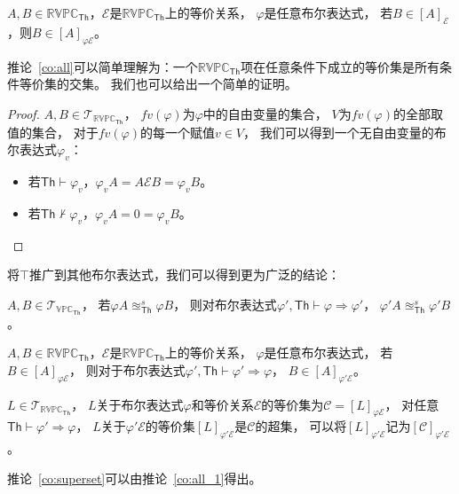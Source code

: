    \begin{corollary}\label{co:all}
      $A,B\in \mathbb{RVPC}_{\mathsf{Th}}$，$\mathcal{E}$是$\mathbb{RVPC}_{\mathsf{Th}}$上的等价关系，
      $\varphi$是任意布尔表达式，
      若$B\in [A]_{\mathcal{E}}$，则$B\in [A]_{\varphi \mathcal{E}}$。
   \end{corollary}
   
   推论~\ref{co:all}可以简单理解为：一个$\mathbb{RVPC}_{\mathsf{Th}}$项在任意条件下成立的等价集是所有条件等价集的交集。
   我们也可以给出一个简单的证明。
   \begin{proof}
      $A,B\in \mathcal{T}_{\mathbb{RVPC}_{\mathsf{Th}}}$，
      $fv(\varphi)$为$\varphi$中的自由变量的集合，
      $V$为$fv(\varphi)$的全部取值的集合，
      对于$fv(\varphi)$的每一个赋值$v\in V$，
      我们可以得到一个无自由变量的布尔表达式$\varphi_v$：
      \begin{itemize}
         \item {
            若$\mathsf{Th}\vdash \varphi_v$，$\varphi_vA=A\mathcal{E}B=\varphi_v B$。
         }
         \item {
            若$\mathsf{Th}\not\vdash \varphi_v$，$\varphi_v A=0=\varphi_v B$。
         }
      \end{itemize}
   \end{proof}

   将$\top$推广到其他布尔表达式，我们可以得到更为广泛的结论：

   \begin{corollary}\label{co:condition}
      $A,B\in \mathcal{T}_{\mathbb{VPC}_{\mathsf{Th}}}$，
      若$\varphi A\approxeq_{\mathsf{Th}}^s \varphi B$，
      则对布尔表达式$\varphi',\mathsf{Th}\vdash \varphi\Rightarrow \varphi'$，
      $\varphi' A\approxeq_{\mathsf{Th}}^s\varphi' B$。
   \end{corollary}

   \begin{corollary}\label{co:all_1}
      $A,B\in \mathbb{RVPC}_{\mathsf{Th}}$，$\mathcal{E}$是$\mathbb{RVPC}_{\mathsf{Th}}$上的等价关系，
      $\varphi$是任意布尔表达式，
      若$B\in [A]_{\varphi\mathcal{E}}$，
      则对于布尔表达式$\varphi',\mathsf{Th}\vdash\varphi'\Rightarrow \varphi$，
      $B\in [A]_{\varphi' \mathcal{E}}$。
   \end{corollary}

   \begin{corollary}\label{co:superset}
      $L\in \mathcal{T}_{\mathbb{RVPC}_{\mathsf{Th}}}$，
      $L$关于布尔表达式$\varphi$和等价关系$\mathcal{E}$的等价集为$\mathcal{C}=[L]_{\varphi\mathcal{E}}$，
      对任意$\mathsf{Th}\vdash \varphi'\Rightarrow\varphi$，
      $L$关于$\varphi'\mathcal{E}$的等价集$[L]_{\varphi'\mathcal{E}}$是$\mathcal{C}$的超集，
      可以将$[L]_{\varphi'\mathcal{E}}$记为$[\mathcal{C}]_{\varphi'\mathcal{E}}$。
   \end{corollary}
   推论~\ref{co:superset}可以由推论~\ref{co:all_1}得出。

